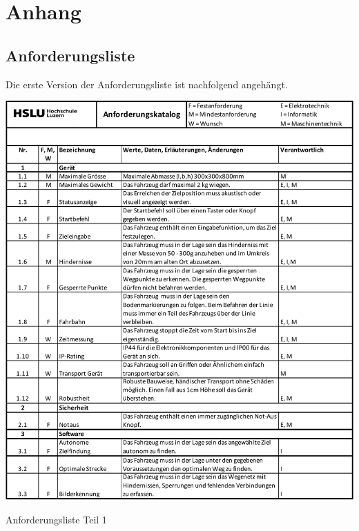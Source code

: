 \newpage
\section{Anhang}

\subsection{Anforderungsliste}\label{anforderungliste}
Die erste Version der Anforderungsliste ist nachfolgend angehängt.

\begin{table}[H]
\centering
\includegraphics[width=\textwidth]{assets/Anforderungsliste_V1.01_page1.pdf}
\caption{Anforderungsliste Teil 1}
\label{table:anforderungsliste_page1}
\end{table}
\newpage

